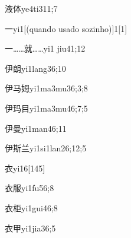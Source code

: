 \begin{verbete}{液体}{ye4ti3}{11;7}
\end{verbete}

\begin{verbete}{一}{yi1}[(quando usado sozinho)]{1}[1]
\end{verbete}

\begin{verbete}{一……就……}{yi1 jiu4}{1;12}
\end{verbete}

\begin{verbete}{伊朗}{yi1lang3}{6;10}
\end{verbete}

\begin{verbete}{伊马姆}{yi1ma3mu3}{6;3;8}
\end{verbete}

\begin{verbete}{伊玛目}{yi1ma3mu4}{6;7;5}
\end{verbete}

\begin{verbete}{伊曼}{yi1man4}{6;11}
\end{verbete}

\begin{verbete}{伊斯兰}{yi1si1lan2}{6;12;5}
\end{verbete}

\begin{verbete}{衣}{yi1}{6}[145]
\end{verbete}

\begin{verbete}{衣服}{yi1fu5}{6;8}
\end{verbete}

\begin{verbete}{衣柜}{yi1gui4}{6;8}
\end{verbete}

\begin{verbete}{衣甲}{yi1jia3}{6;5}
\end{verbete}


